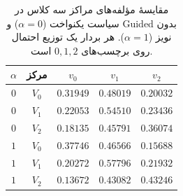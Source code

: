 \begin{table}[htbp]
\centering\small
\caption{مقایسهٔ مؤلفه‌های مراکز سه کلاس در سیاست یکنواخت ($\alpha=0$) و Guided بدون نویز ($\alpha=1$). هر بردار یک توزیع احتمال روی برچسب‌های $0,1,2$ است.}
\label{tab:ch4-guided-mixture-center-vectors}
\begin{tabular}{ccccc}\hline
$\alpha$ & مرکز & $v_0$ & $v_1$ & $v_2$\\\hline
$0$ & $V_{0}$ & $0.31949$ & $0.48019$ & $0.20032$ \\
$0$ & $V_{1}$ & $0.22053$ & $0.54510$ & $0.23436$ \\
$0$ & $V_{2}$ & $0.18135$ & $0.45791$ & $0.36074$ \\
$1$ & $V_{0}$ & $0.37746$ & $0.46566$ & $0.15688$ \\
$1$ & $V_{1}$ & $0.20272$ & $0.57796$ & $0.21932$ \\
$1$ & $V_{2}$ & $0.13672$ & $0.43082$ & $0.43246$ \\
\hline
\end{tabular}
\end{table}
